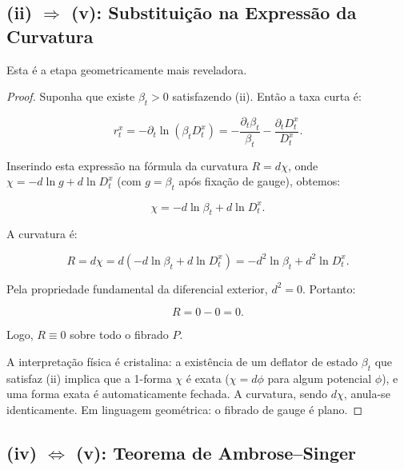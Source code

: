 \subsection{(ii) $\Longrightarrow$ (v): Substitui\c{c}\~ao na Express\~ao da Curvatura}

Esta \'e a etapa geometricamente mais reveladora.

\begin{proof}
Suponha que existe $\beta_t > 0$ satisfazendo (ii). Ent\~ao a taxa curta \'e:

\begin{equation}
r_t^x = -\partial_t \ln(\beta_t D_t^x) = -\frac{\partial_t \beta_t}{\beta_t} - \frac{\partial_t D_t^x}{D_t^x}.
\end{equation}

\noindent Inserindo esta express\~ao na f\'ormula da curvatura $R = d\chi$, onde $\chi = -d\ln g + d\ln D_t^x$ (com $g = \beta_t$ ap\'os fixa\c{c}\~ao de gauge), obtemos:

\begin{equation}
\chi = -d\ln \beta_t + d\ln D_t^x.
\end{equation}

\noindent A curvatura \'e:

\begin{equation}
R = d\chi = d(-d\ln \beta_t + d\ln D_t^x) = -d^2 \ln \beta_t + d^2 \ln D_t^x.
\end{equation}

\noindent Pela propriedade fundamental da diferencial exterior, $d^2 = 0$. Portanto:

\begin{equation}
R = 0 - 0 = 0.
\end{equation}

\noindent Logo, $R \equiv 0$ sobre todo o fibrado $P$.

A interpreta\c{c}\~ao f\'isica \'e cristalina: a exist\^encia de um deflator de estado $\beta_t$ que satisfaz (ii) implica que a 1-forma $\chi$ \'e exata ($\chi = d\phi$ para algum potencial $\phi$), e uma forma exata \'e automaticamente fechada. A curvatura, sendo $d\chi$, anula-se identicamente. Em linguagem geom\'etrica: o fibrado de gauge \'e plano.
\end{proof}

\subsection{(iv) $\Longleftrightarrow$ (v): Teorema de Ambrose--Singer}

